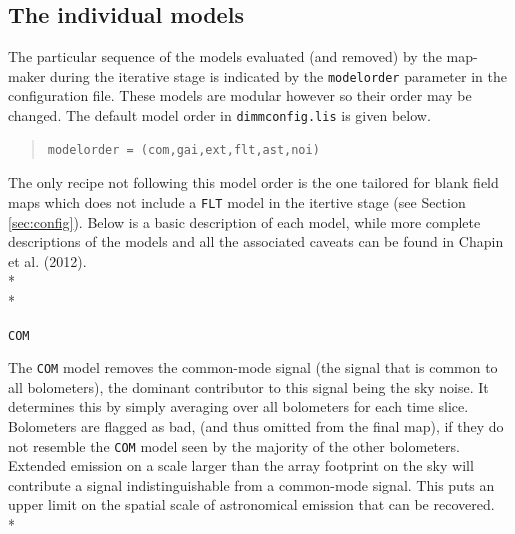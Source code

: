 \documentclass[twoside,11pt]{article}
\newcommand{\xlabel}[1]{}
\renewcommand{\_}{\texttt{\symbol{95}}}
\newenvironment{myquote}{\begin{quote}\begin{small}}{\end{small}\end{quote}}
\begin{document}
\subsection{\xlabel{models}The individual models}
\label{sec:models}
The particular sequence of the models evaluated (and removed) by the map-maker during the iterative stage is indicated by the \texttt{modelorder} parameter in the configuration file. These models are modular however so their order may be changed. The default model order in \texttt{dimmconfig.lis} is given below.
\vspace{-0.1cm}
\begin{myquote}
\begin{verbatim}
modelorder = (com,gai,ext,flt,ast,noi)
\end{verbatim}
\end{myquote}
\vspace{-0.1cm}
 The only recipe not following this model order is the one tailored for blank field maps which does not include a \texttt{FLT} model in the itertive stage (see Section \ref{sec:config}). Below is a basic description of each model, while more complete descriptions of the models and all the associated caveats can be found in Chapin et al. (2012).
\\*\\*
\begin{minipage}[t]{0.07\linewidth}
\texttt{COM}
\end{minipage}
\begin{minipage}[t]{0.92\linewidth}The \texttt{COM} model removes the common-mode signal (the signal that is common to all bolometers), the dominant contributor to this signal being the sky noise. It determines this by simply averaging over all bolometers for each time slice.  Bolometers are flagged as bad, (and thus omitted from the final map), if they do not resemble the \texttt{COM} model seen by the majority of the other bolometers. \newline Extended emission on a scale larger than the array footprint on the sky will contribute a signal indistinguishable from a common-mode signal. This puts an upper limit on the spatial scale of astronomical emission that can be recovered. \\*
\end{minipage}
\end{document}
